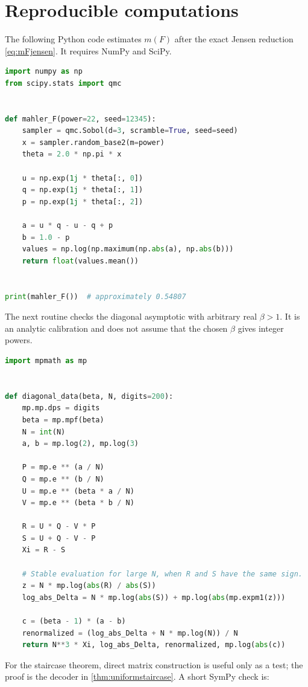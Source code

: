 \documentclass[11pt]{article}
\theoremstyle{definition}
\theoremstyle{remark}
\begin{document}
\section{Reproducible computations}\label{app:code}

The following Python code estimates $m(F)$ after the exact Jensen reduction
\eqref{eq:mFjensen}.  It requires NumPy and SciPy.

\begin{lstlisting}[language=Python]
import numpy as np
from scipy.stats import qmc


def mahler_F(power=22, seed=12345):
    sampler = qmc.Sobol(d=3, scramble=True, seed=seed)
    x = sampler.random_base2(m=power)
    theta = 2.0 * np.pi * x

    u = np.exp(1j * theta[:, 0])
    q = np.exp(1j * theta[:, 1])
    p = np.exp(1j * theta[:, 2])

    a = u * q - u - q + p
    b = 1.0 - p
    values = np.log(np.maximum(np.abs(a), np.abs(b)))
    return float(values.mean())


print(mahler_F())  # approximately 0.54807
\end{lstlisting}

The next routine checks the diagonal asymptotic with arbitrary real $\beta>1$.
It is an analytic calibration and does not assume that the chosen $\beta$ gives
integer powers.

\begin{lstlisting}[language=Python]
import mpmath as mp


def diagonal_data(beta, N, digits=200):
    mp.mp.dps = digits
    beta = mp.mpf(beta)
    N = int(N)
    a, b = mp.log(2), mp.log(3)

    P = mp.e ** (a / N)
    Q = mp.e ** (b / N)
    U = mp.e ** (beta * a / N)
    V = mp.e ** (beta * b / N)

    R = U * Q - V * P
    S = U + Q - V - P
    Xi = R - S

    # Stable evaluation for large N, when R and S have the same sign.
    z = N * mp.log(abs(R) / abs(S))
    log_abs_Delta = N * mp.log(abs(S)) + mp.log(abs(mp.expm1(z)))

    c = (beta - 1) * (a - b)
    renormalized = (log_abs_Delta + N * mp.log(N)) / N
    return N**3 * Xi, log_abs_Delta, renormalized, mp.log(abs(c))
\end{lstlisting}

For the staircase theorem, direct matrix construction is useful only as a test;
the proof is the decoder in \cref{thm:uniformstaircase}.  A short SymPy check is:
\end{document}
